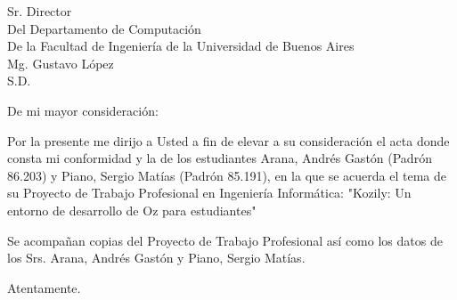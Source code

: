 \documentclass{letter}
\date{}
\begin{document}
\begin{letter}{
    Sr. Director \\
    Del Departamento de Computación \\
    De la Facultad de Ingeniería de la Universidad de Buenos Aires \\
    Mg. Gustavo López \\
    S.D.}

  \opening{De mi mayor consideración:}

  \setlength\parindent{12.25em}
  \setlength\parskip{1em}

  Por la presente me dirijo a Usted a fin de elevar a su consideración el acta
  donde consta mi conformidad y la de los estudiantes Arana, Andrés Gastón
  (Padrón 86.203) y Piano, Sergio Matías (Padrón 85.191), en la que se acuerda
  el tema de su Proyecto de Trabajo Profesional en Ingeniería Informática:
  "Kozily: Un entorno de desarrollo de Oz para estudiantes"

  Se acompañan copias del Proyecto de Trabajo Profesional así como los datos de
  los Srs. Arana, Andrés Gastón y Piano, Sergio Matías.

  \closing{Atentamente.}

\end{letter}
\end{document}
